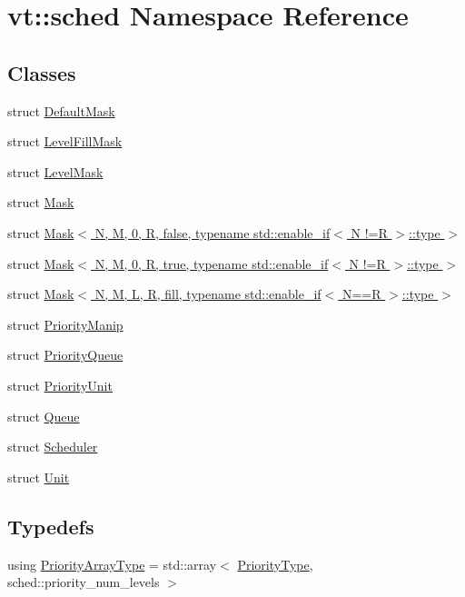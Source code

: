 \hypertarget{namespacevt_1_1sched}{}\section{vt\+:\+:sched Namespace Reference}
\label{namespacevt_1_1sched}
\subsection*{Classes}
\begin{DoxyCompactItemize}
\item 
struct \hyperlink{structvt_1_1sched_1_1_default_mask}{Default\+Mask}
\item 
struct \hyperlink{structvt_1_1sched_1_1_level_fill_mask}{Level\+Fill\+Mask}
\item 
struct \hyperlink{structvt_1_1sched_1_1_level_mask}{Level\+Mask}
\item 
struct \hyperlink{structvt_1_1sched_1_1_mask}{Mask}
\item 
struct \hyperlink{structvt_1_1sched_1_1_mask_3_01_n_00_01_m_00_010_00_01_r_00_01false_00_01typename_01std_1_1enabl81bb113ca3757a124cb0c647589aa3dd}{Mask$<$ N, M, 0, R, false, typename std\+::enable\+\_\+if$<$ N !=\+R $>$\+::type $>$}
\item 
struct \hyperlink{structvt_1_1sched_1_1_mask_3_01_n_00_01_m_00_010_00_01_r_00_01true_00_01typename_01std_1_1enable84a8b0b373fb69b0fca50672234c2a86}{Mask$<$ N, M, 0, R, true, typename std\+::enable\+\_\+if$<$ N !=\+R $>$\+::type $>$}
\item 
struct \hyperlink{structvt_1_1sched_1_1_mask_3_01_n_00_01_m_00_01_l_00_01_r_00_01fill_00_01typename_01std_1_1enablb425bc242171a4de39f2db76b78da09f}{Mask$<$ N, M, L, R, fill, typename std\+::enable\+\_\+if$<$ N==\+R $>$\+::type $>$}
\item 
struct \hyperlink{structvt_1_1sched_1_1_priority_manip}{Priority\+Manip}
\item 
struct \hyperlink{structvt_1_1sched_1_1_priority_queue}{Priority\+Queue}
\item 
struct \hyperlink{structvt_1_1sched_1_1_priority_unit}{Priority\+Unit}
\item 
struct \hyperlink{structvt_1_1sched_1_1_queue}{Queue}
\item 
struct \hyperlink{structvt_1_1sched_1_1_scheduler}{Scheduler}
\item 
struct \hyperlink{structvt_1_1sched_1_1_unit}{Unit}
\end{DoxyCompactItemize}
\subsection*{Typedefs}
\begin{DoxyCompactItemize}
\item 
using \hyperlink{namespacevt_1_1sched_a2dbd1daff26f79efbff3f418ad9b2a8b}{Priority\+Array\+Type} = std\+::array$<$ \hyperlink{namespacevt_a86bff9f556eb761b27fc8600d006ac04}{Priority\+Type}, sched\+::priority\+\_\+num\+\_\+levels $>$
\end{DoxyCompactItemize}
